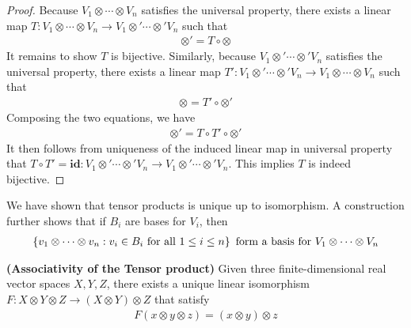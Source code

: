 \documentclass{report}
\begin{document}
\begin{proof}
Because $V_1 \otimes  \cdots \otimes  V_n$ satisfies the universal property, there exists a linear map $T:V_1 \otimes  \cdots \otimes  V_n\rightarrow V_1 \otimes'  \cdots \otimes' V_n  $ such that  
\begin{align*}
\otimes' =T \circ \otimes  
\end{align*}
It remains to show $T$ is bijective. Similarly, because $V_1 \otimes ' \cdots \otimes'  V_n$ satisfies the universal property, there exists a linear map $T':V_1 \otimes'  \cdots \otimes'  V_n\rightarrow V_1 \otimes  \cdots \otimes V_n  $ such that 
\begin{align*}
\otimes = T' \circ \otimes  '
\end{align*}
Composing the two equations, we have 
\begin{align*}
\otimes '=T\circ T' \circ \otimes  '
\end{align*}
It then follows from uniqueness of the induced linear map in universal property that $T \circ T'=\textbf{id}:V_1 \otimes  ' \cdots \otimes  'V_n \rightarrow V_1 \otimes  ' \cdots \otimes  'V_n$. This implies $T$ is indeed bijective. 
\end{proof}
\begin{mdframed}
We have shown that tensor products is unique up to isomorphism. A construction further shows that if $B_i$ are bases for $V_i$, then 
 \begin{align*}
\left\{ v_1 \otimes  \cdots \otimes v_n: v_i \in B_i\text{ for all }1\leq i\leq n   \right\}\text{ form a basis for }V_1 \otimes  \cdots \otimes  V_n
\end{align*}
\end{mdframed}
\begin{theorem}
\textbf{(Associativity of the Tensor product)} Given three finite-dimensional real vector spaces $X,Y,Z$,  there exists a unique linear isomorphism $F:X\otimes  Y\otimes  Z\rightarrow (X\otimes  Y)\otimes  Z$ that satisfy 
\begin{align*}
F(x\otimes  y \otimes  z)=(x\otimes  y)\otimes  z
\end{align*}
\end{theorem}
\end{document}
